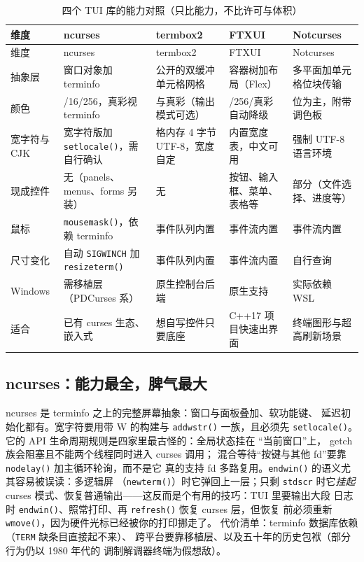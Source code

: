 \documentclass[12pt,a4paper,fontset=fandol]{ctexbook}
\newcommand{\cpp}[1]{C++#1}
\newcommand{\Fn}[1]{\texttt{#1()}}
\newcommand{\Tp}[1]{\texttt{#1}}
\begin{document}
\begin{longtable}{@{}>{\raggedright\arraybackslash}p{}
                 >{\raggedright\arraybackslash}p{}
                 >{\raggedright\arraybackslash}p{}
                 >{\raggedright\arraybackslash}p{}
                 >{\raggedright\arraybackslash}p{}@{}}
\caption{四个 TUI 库的能力对照（只比能力，不比许可与体积）} \\
\toprule
维度 & ncurses & termbox2 & FTXUI & Notcurses \\
\midrule
\endfirsthead
\toprule
维度 & ncurses & termbox2 & FTXUI & Notcurses \\
\midrule
\endhead
抽象层 & 窗口对象加 terminfo & 公开的双缓冲单元格网格 &
容器树加布局（Flex） & 多平面加单元格位块传输 \\
颜色 & 8/16/256，真彩视 terminfo & 256 与真彩（输出模式可选） &
16/256/真彩自动降级 & 24 位为主，附带调色板 \\
宽字符与 CJK & 宽字符版加 \Fn{setlocale}，需自行确认 &
格内存 4 字节 UTF-8，宽度自定 & 内置宽度表，中文可用 &
强制 UTF-8 语言环境 \\
现成控件 & 无（panels、menus、forms 另装） & 无 &
按钮、输入框、菜单、表格等 & 部分（文件选择、进度等） \\
鼠标 & \Fn{mousemask}，依赖 terminfo & 事件队列内置 & 事件流内置 &
事件流内置 \\
尺寸变化 & 自动 \Tp{SIGWINCH} 加 \Fn{resizeterm} & 事件队列内置 &
事件流内置 & 自行查询 \\
Windows & 需移植层（PDCurses 系） & 原生控制台后端 & 原生支持 &
实际依赖 WSL \\
适合 & 已有 curses 生态、嵌入式 & 想自写控件只要底座 & \cpp{17}
项目快速出界面 & 终端图形与超高刷新场景 \\
\bottomrule
\end{longtable}

\subsection{ncurses：能力最全，脾气最大}

ncurses 是 terminfo 之上的完整屏幕抽象：窗口与面板叠加、软功能键、
延迟初始化都有。宽字符要用带 W 的构建与 \Fn{addwstr} 一族，且必须先
\Fn{setlocale}。它的 API 生命周期规则是四家里最古怪的：全局状态挂在
``当前窗口''上， getch 族会阻塞且不能两个线程同时进入 curses 调用；
混合等待``按键与其他 fd''要靠 \Fn{nodelay} 加主循环轮询，而不是它
真的支持 fd 多路复用。\Fn{endwin} 的语义尤其容易被误读：多逻辑屏
（\Fn{newterm}）时它弹回上一层；只剩 \Tp{stdscr} 时它\emph{挂起}
curses 模式、恢复普通输出——这反而是个有用的技巧：TUI 里要输出大段
日志时 \Fn{endwin}、照常打印、再 \Fn{refresh} 恢复 curses 层，但恢复
前必须重新 \Fn{wmove}，因为硬件光标已经被你的打印挪走了。
代价清单：terminfo 数据库依赖（\Tp{TERM} 缺条目直接起不来）、
跨平台要靠移植层、以及五十年的历史包袱（部分行为仍以 1980 年代的
调制解调器终端为假想敌）。
\end{document}
